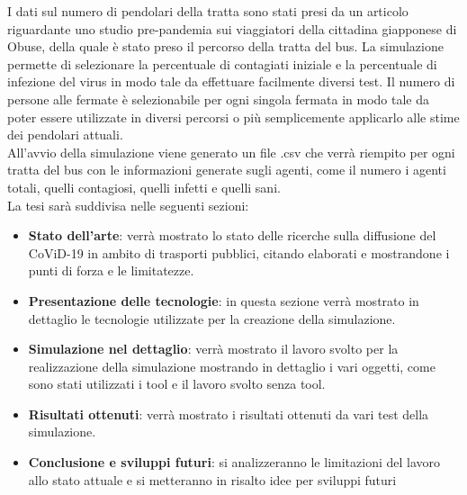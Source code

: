 \documentclass[12pt, openany]{book}
\begin{document}
		
		I dati sul numero di pendolari della tratta sono stati presi da un articolo riguardante uno studio pre-pandemia sui viaggiatori della cittadina giapponese di Obuse\cite{Obuse}, della quale è stato preso il percorso della tratta del bus. La simulazione permette di selezionare la percentuale di contagiati iniziale e la percentuale di infezione del virus in modo tale da effettuare facilmente diversi test. Il numero di persone alle fermate è selezionabile per ogni singola fermata in modo tale da poter essere utilizzate in diversi percorsi o più semplicemente applicarlo alle stime dei pendolari attuali.\\
		All'avvio della simulazione viene generato un file .csv che verrà riempito per ogni tratta del bus con le informazioni generate sugli agenti, come il numero i agenti totali, quelli contagiosi, quelli infetti e quelli sani.
		\\
		La tesi sarà suddivisa nelle seguenti sezioni:
		\begin{itemize}
			\item \textbf{Stato dell'arte}: verrà mostrato lo stato delle ricerche sulla diffusione del CoViD-19 in ambito di trasporti pubblici, citando elaborati e mostrandone i punti di forza e le limitatezze.
			\item \textbf{Presentazione delle tecnologie}: in questa sezione verrà mostrato in dettaglio le tecnologie utilizzate per la creazione della simulazione.
			\item\textbf{Simulazione nel dettaglio}: verrà mostrato il lavoro svolto per la realizzazione della simulazione mostrando in dettaglio i vari oggetti, come sono stati utilizzati i tool e il lavoro svolto senza tool.
			\item\textbf{Risultati ottenuti}: verrà mostrato i risultati ottenuti da vari test della simulazione.
			\item\textbf{Conclusione e sviluppi futuri}: si analizzeranno le limitazioni del lavoro allo stato attuale e si metteranno in risalto idee per sviluppi futuri
		\end{itemize}
\end{document}
